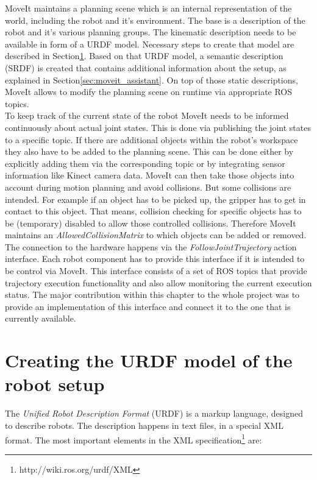 MoveIt maintains a planning scene which is an internal representation of the world, including the robot and it's environment. The base is a description of the robot and it's various planning groups. 
The kinematic description needs to be available in form of a URDF model. Necessary steps to create that model are described in Section\ref{sec:urdf}. Based on that URDF model, a semantic description (SRDF) is created that contains additional information about the setup, as explained in Section\ref{sec:moveit_assistant}. On top of those static descriptions, MoveIt allows to modify the planning scene on runtime via appropriate ROS topics.\\

To keep track of the current state of the robot MoveIt needs to be informed continuously about actual joint states. This is done via publishing the joint states to a specific topic. If there are additional objects within the robot's workspace they also have to be added to the planning scene. This can be done either by explicitly adding them via the corresponding topic or by integrating sensor information like Kinect camera data. MoveIt can then take those objects into account during motion planning and avoid collisions. But some collisions are intended. For example if an object has to be picked up, the gripper has to get in contact to this object. That means, collision checking for specific objects has to be (temporary) disabled to allow those controlled collisions. Therefore MoveIt maintains an \emph{AllowedCollisionMatrix} to which objects can be added or removed. The connection to the hardware happens via the \emph{FollowJointTrajectory} action interface. Each robot component has to provide this interface if it is intended to be control via MoveIt. This interface consists of a set of ROS topics that provide trajectory execution functionality and also allow monitoring the current execution status. The major contribution within this chapter to the whole project was to provide an implementation of this interface and connect it to the one that is currently available.

\section{Creating the URDF model of the robot setup}
\label{sec:urdf}

The \emph{Unified Robot Description Format} (URDF) is a markup language, designed to describe robots. The description happens in text files, in a special XML format. The most important elements in the XML specification\footnote{http://wiki.ros.org/urdf/XML} are:

